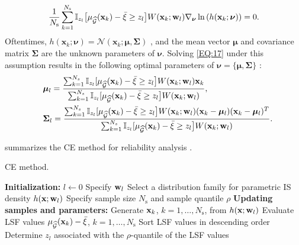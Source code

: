 \documentclass[preprint,3p]{elsarticle}
\begin{document}
\begin{linenumbers}
\begin{equation}
    \frac{1}{N_\text{s}}\displaystyle\sum_{k=1}^{N_\text{s}}{\mathbb{I}_{z_l}\bigr[\mu_{\widehat{\mathcal{G}}}(\textbf{x}_k) - \bar\xi \geq z_l \bigl]W(\textbf{x}_k;{\bf w}_{l})\nabla_{\boldsymbol{\nu}}\ln\left(h(\mathbf{x}_k;\boldsymbol{\nu})\right)} = 0.
\label{EQ:17}
\end{equation}
Oftentimes, ${h}\left(\textbf{x}_k;\boldsymbol{\nu}\right) = \mathcal{N}\left(\textbf{x}_k;\boldsymbol{\mu},\boldsymbol{\Sigma}\right)$ \cite{GEYER2019}, and the mean vector $\boldsymbol{\mu}$ and covariance matrix $\boldsymbol{\Sigma}$ are the unknown parameters of $\boldsymbol{\nu}$. Solving \cref{EQ:17} under this assumption results in the following optimal parameters of $\boldsymbol{\nu}=\{\boldsymbol{\mu},\boldsymbol{\Sigma}\}$ \cite{GEYER2019, CHAUDHURI2020}:
\begin{equation}
\begin{aligned} 
\quad & \boldsymbol{\mu}_{l} = \frac{\sum_{k=1}^{N_{s}}\mathbb{I}_{z_l}[\mu_{\widehat{\mathcal{G}}}(\textbf{x}_k) - \bar\xi \geq z_l \bigl]W(\textbf{x}_k;{\bf w}_{l})\textbf{x}_k}{\sum_{k=1}^{N_{s}}\mathbb{I}_{z_l}[\mu_{\widehat{\mathcal{G}}}(\textbf{x}_k) - \bar\xi \geq z_l \bigl]W(\textbf{x}_k;{\bf w}_{l})},\\
& \boldsymbol{\Sigma}_{l}=\frac{\sum_{k=1}^{N_{s}}\mathbb{I}_{z_l}[\mu_{\widehat{\mathcal{G}}}(\textbf{x}_k) - \bar\xi \geq z_l \bigl]W(\textbf{x}_k;{\bf w}_{l})(\textbf{x}_k-\boldsymbol{\mu}_{l})(\textbf{x}_k-\boldsymbol{\mu}_{l})^T}{\sum_{k=1}^{N_{s}}\mathbb{I}_{z_l}[\mu_{\widehat{\mathcal{G}}}(\textbf{x}_k) - \bar\xi \geq z_l \bigl]W(\textbf{x}_k;{\bf w}_{l})}.
\end{aligned}
\label{EQ:18}
\end{equation}

 summarizes the CE method for reliability analysis \cite{GEYER2019}. 
\begin{algorithm}[t]
	\caption{CE method.}\label{Algo1}
	\begin{algorithmic}[1]
		\State \textbf{Initialization:} 
		\State $l \gets 0$
		\State Specify ${\bf w}_l$
		\State Select a distribution family for parametric IS density $h({\bf x};{\bf w}_l)$
		\State Specify sample size $N_\text{s}$ and sample quantile $\rho$
		\State \textbf{Updating samples and parameters:} 
		\State Generate ${\bf x}_k$, $k=1,\dots,N_\text{s}$, from $h({\bf x};{\bf w}_l)$ \label{Algo1-7}
		\State Evaluate LSF values $\mu_{\widehat{\mathcal{G}}}({\bf x}_k)-\bar{\xi}$, $k=1,\dots,N_\text{s}$ \label{Algo1-8}
		\State Sort LSF values in descending order
		\State Determine $z_l$ associated with the $\rho$-quantile of the LSF values
		

\end{algorithmic}
\end{algorithm}
\end{linenumbers}
\end{document}
